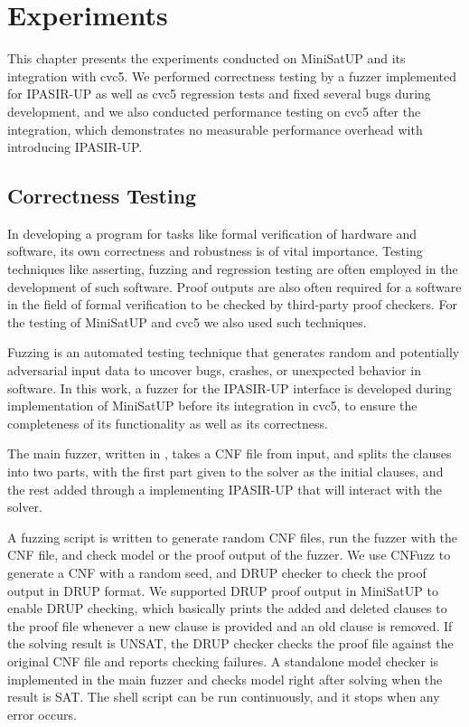 \chapter{Experiments}

This chapter presents the experiments conducted on MiniSatUP and its integration with cvc5. We performed correctness testing by a fuzzer implemented for IPASIR-UP as well as cvc5 regression tests and fixed several bugs during development, and we also conducted performance testing on cvc5 after the integration, which demonstrates no measurable performance overhead with introducing IPASIR-UP.

\section{Correctness Testing}

In developing a program for tasks like formal verification of hardware and software, its own correctness and robustness is of vital importance. Testing techniques like asserting, fuzzing and regression testing are often employed in the development of such software. Proof outputs are also often required for a software in the field of formal verification to be checked by third-party proof checkers. For the testing of MiniSatUP and cvc5 we also used such techniques.

Fuzzing is an automated testing technique that generates random and potentially adversarial input data to uncover bugs, crashes, or unexpected behavior in software. In this work, a fuzzer for the IPASIR-UP interface is developed during implementation of MiniSatUP before its integration in cvc5, to ensure the completeness of its functionality as well as its correctness.

The main fuzzer, written in , takes a CNF file from input, and splits the clauses into two parts, with the first part given to the solver as the initial clauses, and the rest added through a  implementing IPASIR-UP that will interact with the solver.

A fuzzing script is written to generate random CNF files, run the fuzzer with the CNF file, and check model or the proof output of the fuzzer. We use CNFuzz \cite{BrummayerLonsingBiere-SAT10} to generate a CNF with a random seed, and DRUP checker \cite{6679408} to check the proof output in DRUP format. We supported DRUP proof output in MiniSatUP to enable DRUP checking, which basically prints the added and deleted clauses to the proof file whenever a new clause is provided and an old clause is removed. If the solving result is UNSAT, the DRUP checker checks the proof file against the original CNF file and reports checking failures. A standalone model checker is implemented in the main fuzzer and checks model right after solving when the result is SAT. The shell script can be run continuously, and it stops when any error occurs.

